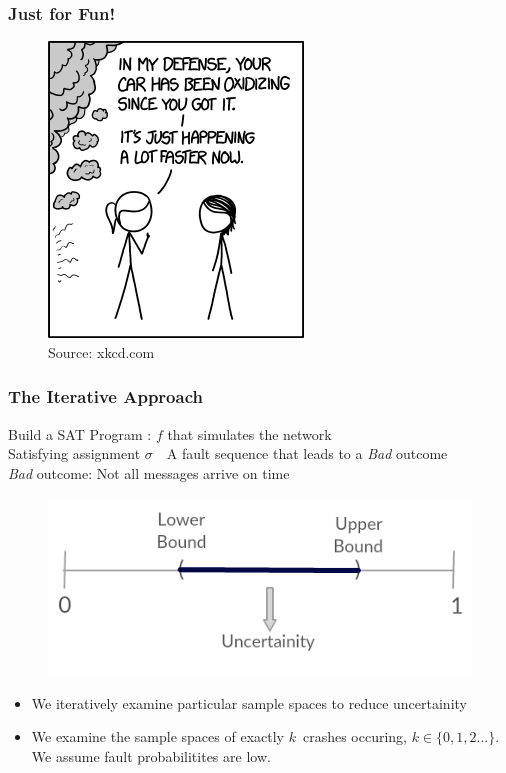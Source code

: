 \documentclass{beamer}
\begin{document}

\begin{frame}
\frametitle{Just for Fun!}
	\begin{figure}
	\includegraphics[scale=0.7]{media/xkcd1.png}
	\caption{\tiny Source: xkcd.com}
	\end{figure}
\end{frame}


\begin{frame}
\frametitle{The Iterative Approach}
	Build a SAT Program : $ f $ that simulates the network\\[2ex]
	Satisfying assignment $\sigma$\ \leftrightarrow\ A fault sequence that leads to a \textit{Bad} outcome\\
	\textit{Bad} outcome: Not all messages arrive on time\\[3ex]
	\vspace*{-10pt}
	\begin{figure}
	\includegraphics[scale=0.4]{media/Real_Line.png}
	\end{figure}
	\vspace*{-10pt}
	\begin{itemize}
	\item We iteratively examine particular sample spaces to reduce uncertainity
	\item We examine the sample spaces of exactly $k$\ crashes occuring, $k\in\{0,1,2...\}$. We assume fault probabilitites are low.
	\end{itemize}
\end{frame}
\end{document}
